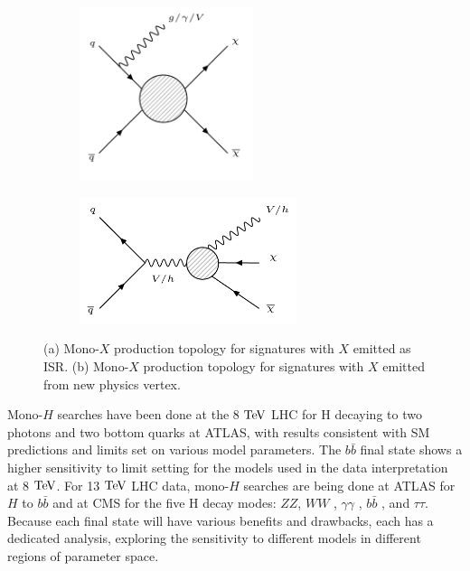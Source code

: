 \begin{figure}[tbh]
\centering
\begin{subfigure}{0.45\textwidth}
\centering
\includegraphics[width=2in]{figures/isr.png}
\caption{}
\label{fig:isr}
\end{subfigure}
\begin{subfigure}{0.45\textwidth}
\centering
\includegraphics[width=2.5in]{figures/fsr.png}
\caption{}
\label{fig:fsr}
\end{subfigure}
\caption{(a) Mono-$X$ production topology for signatures with $X$ emitted as ISR. (b) Mono-$X$ production topology for signatures with $X$ emitted from new physics vertex.}
\label{monox}
\end{figure}

Mono-$H$ searches have been done at the 8 $\mathrm{Te\kern -0.1em V}$ LHC for H decaying to two photons \cite{Aad:2015yga} and two bottom quarks \cite{Aad:2015dva} at ATLAS, with results consistent with SM predictions and limits set on various model parameters. The $b\bar{b}$ final state shows a higher sensitivity to limit setting for the models used in the data interpretation at 8 $\mathrm{Te\kern -0.1em V}$. For 13 $\mathrm{Te\kern -0.1em V}$ LHC data, mono-$H$ searches are being done at ATLAS for $H$ to $b\bar{b}$ \cite{Atlas:2016Hbb} and at CMS for the five H decay modes: $ZZ$, $WW$ \cite{CMS-AN-15-338}, $\gamma\gamma$ \cite{CMS-AN-15-203}, $b\bar{b}$ \cite{CMS-AN-15-209}, and $\tau\tau$. Because each final state will have various benefits and drawbacks, each has a dedicated analysis, exploring the sensitivity to different models in different regions of parameter space.

